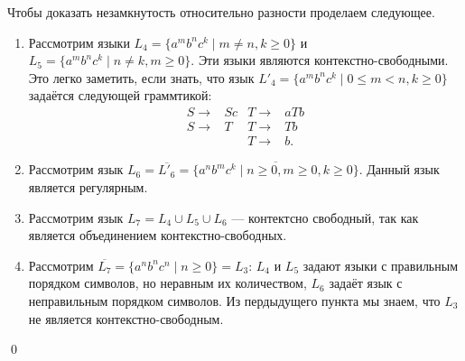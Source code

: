 Чтобы доказать незамкнутость относительно разности проделаем следующее.
\begin{enumerate}
\item Рассмотрим языки $L_4 = \{a^m b^n c^k \mid m \neq n, k \geq 0\}$ и $L_5 = \{a^m b^n c^k \mid n \neq k, m \geq 0\}$.
Эти языки являются контекстно-свободными.
Это легко заметить, если знать, что язык $L'_4 = \{a^m b^n c^k \mid 0 \leq m < n, k \geq 0\}$ задаётся следующей граммтикой:
\begin{align*}
S \to & S c & T \to & a T b \\
S \to & T &   T \to & T b \\
      &   &   T \to & b.
\end{align*}

\item Рассмотрим язык $L_6 = \overline{L'_6} = \overline{\{a^n b^m c^k \mid n \geq 0, m \geq 0, k \geq 0\}}$. Данный язык является регулярным.

\item Рассмотрим язык $L_7 = L_4 \cup L_5 \cup L_6$ --- контектсно свободный, так как является объединением контекстно-свободных.

\item Рассмотрим $\overline{L_7} = \{a^n b^n c^n \mid n \geq 0\} = L_3$: $L_4$ и $L_5$ задают языки с правильным порядком символов, но неравным их количеством, $L_6$ задаёт язык с неправильным порядком символов.
Из пердыдущего пункта мы знаем, что $L_3$  не является контекстно-свободным.

\end{enumerate}

\qed

